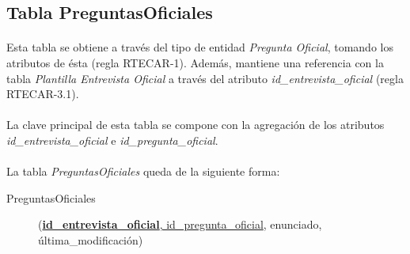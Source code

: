    \subsection{Tabla PreguntasOficiales}

      \paragraph{}Esta tabla se obtiene a través del tipo de entidad
      \textit{Pregunta Oficial}, tomando los atributos de ésta
      (regla RTECAR-1). Además, mantiene una referencia con la tabla
      \textit{Plantilla Entrevista Oficial} a través del atributo
      \textit{id\_entrevista\_oficial} (regla RTECAR-3.1).

      \paragraph{}La clave principal de esta tabla se compone con la agregación
      de los atributos \textit{id\_entrevista\_oficial} e
      \textit{id\_pregunta\_oficial}.

      \paragraph{}La tabla \textit{PreguntasOficiales} queda de la
      siguiente forma:

      \begin{description}
         \item[PreguntasOficiales] \begin{flushleft}(\underline{\textbf{id\_entrevista\_oficial},
         id\_pregunta\_oficial}, enunciado, última\_modificación)\end{flushleft}
      \end{description}
